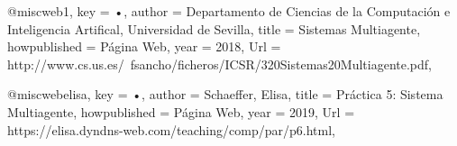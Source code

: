 @misc{web1,
key = {•},
author = {Departamento de Ciencias de la Computación e Inteligencia Artifical, Universidad de Sevilla},
title = {Sistemas Multiagente},
howpublished = {Página Web},
year = {2018},
Url = {http://www.cs.us.es/~fsancho/ficheros/ICSR/320Sistemas20Multiagente.pdf},
}

@misc{webelisa,
key = {•},
author = {Schaeffer, Elisa},
title = {Práctica 5: Sistema Multiagente},
howpublished = {Página Web},
year = {2019},
Url = {https://elisa.dyndns-web.com/teaching/comp/par/p6.html},
}

